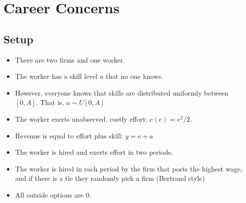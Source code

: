 \documentclass{article}
\begin{document}
\section{Career Concerns}


\subsection*{Setup}
\begin{itemize}
        \item There are two firms and one worker.
        \item The worker has a skill level $a$ that no one knows.
        \item However, everyone knows that skills are distributed uniformly between $[0,A]$. That is, $a\sim U[0,A]$
        \item The worker exerts unobserved, costly effort: $c(e)=e^2/2$.
        \item Revenue is equal to effort plus skill: $y=e+a$
        \item The worker is hired and exerts effort in two periods.
        \item The worker is hired in each period by the firm that posts the highest wage, and if there is a tie they randomly pick a firm (Bertrand style)
        \item All outside options are 0.
\end{itemize}
\end{document}
